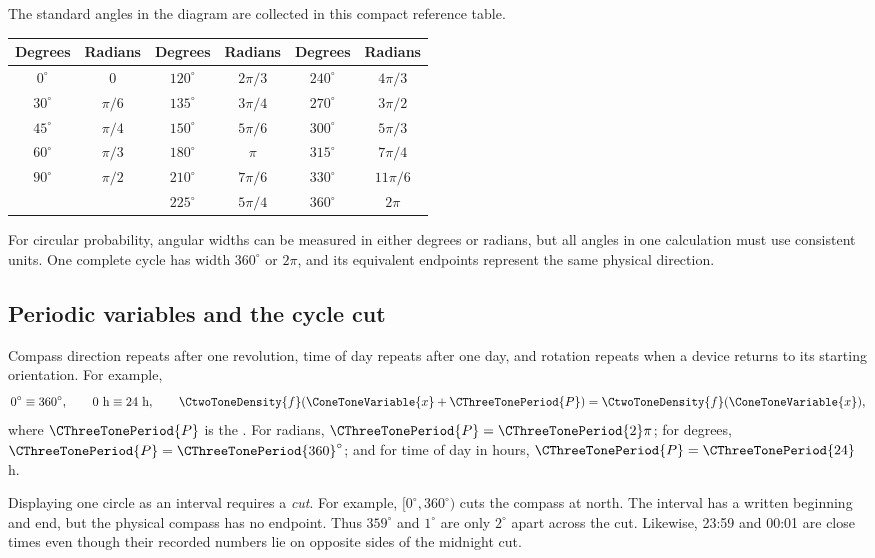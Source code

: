 	The standard angles in the diagram are collected in this compact reference
	table.
	\begin{center}
		\small
		\renewcommand{\arraystretch}{1.15}
		\begin{tabular}{c|c@{\qquad}c|c@{\qquad}c|c}
			\textbf{Degrees} & \textbf{Radians} & \textbf{Degrees} & \textbf{Radians}
				& \textbf{Degrees} & \textbf{Radians} \\ \hline
			$0^\circ$   & $0$       & $120^\circ$ & $2\pi/3$  & $240^\circ$ & $4\pi/3$  \\
			$30^\circ$  & $\pi/6$   & $135^\circ$ & $3\pi/4$  & $270^\circ$ & $3\pi/2$  \\
			$45^\circ$  & $\pi/4$   & $150^\circ$ & $5\pi/6$  & $300^\circ$ & $5\pi/3$  \\
			$60^\circ$  & $\pi/3$   & $180^\circ$ & $\pi$     & $315^\circ$ & $7\pi/4$  \\
			$90^\circ$  & $\pi/2$   & $210^\circ$ & $7\pi/6$  & $330^\circ$ & $11\pi/6$ \\
			                 &           & $225^\circ$ & $5\pi/4$  & $360^\circ$ & $2\pi$
		\end{tabular}
	\end{center}

	For circular probability, angular widths can be measured in either degrees or
	radians, but all angles in one calculation must use consistent units.  One
	complete cycle has width $360^\circ$ or $2\pi$, and its equivalent endpoints
	represent the same physical direction.

	\subsection{Periodic variables and the cycle cut}\label{sec:c3-intro-periodic}
	Compass direction repeats after one revolution, time of day repeats after one
	day, and rotation repeats when a device returns to its starting orientation.
	For example,
	\[
	0^\circ\equiv360^\circ,
	\qquad 0\text{ h}\equiv24\text{ h},
	\qquad \CtwoToneDensity{f}(\ConeToneVariable{x}+\CThreeTonePeriod{P})=\CtwoToneDensity{f}(\ConeToneVariable{x}),
	\]
	where $\CThreeTonePeriod{P}$ is the  .  For radians, $\CThreeTonePeriod{P}=\CThreeTonePeriod{2}\pi$; for degrees,
	$\CThreeTonePeriod{P}=\CThreeTonePeriod{360}^\circ$; and for time of day in hours, $\CThreeTonePeriod{P}=\CThreeTonePeriod{24}$ h.
	
	Displaying one circle as an interval requires a \emph{cut}.  For example,
	$[0^\circ,360^\circ)$ cuts the compass at north.  The interval has a written
	beginning and end, but the physical compass has no endpoint.  Thus
	$359^\circ$ and $1^\circ$ are only $2^\circ$ apart across the cut.  Likewise,
	23:59 and 00:01 are close times even though their recorded numbers lie on
	opposite sides of the midnight cut.
	
